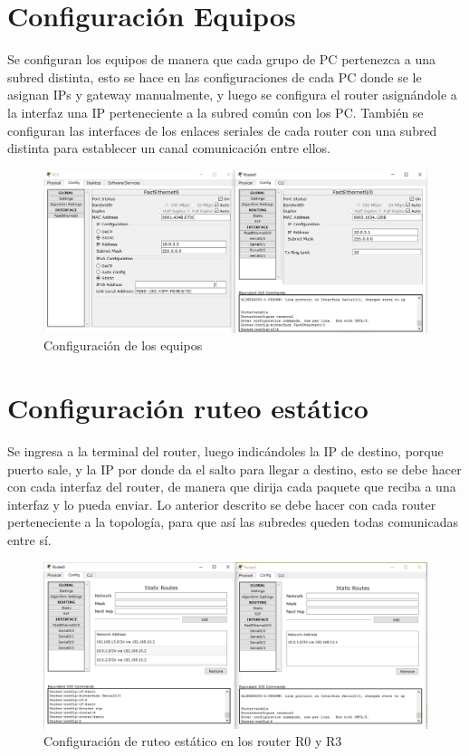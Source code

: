 \documentclass{udpreport}
\begin{document}
	\section{Configuración Equipos}
	Se configuran los equipos de manera que cada grupo de PC pertenezca a una subred distinta, esto se hace en las configuraciones de cada PC
	donde se le asignan IPs y gateway manualmente, y luego se configura el router asignándole a la interfaz una IP perteneciente a la subred común con los
	PC. También se configuran las interfaces de los enlaces seriales de cada router con una subred distinta para establecer un canal comunicación entre ellos.
	\begin{figure}[H]
	\centering
	\includegraphics[width=\textwidth]{Configuracion_equipos.PNG}
	\caption{Configuración de los equipos}
	\end{figure}
	\section{Configuración ruteo estático}
	Se ingresa a la terminal del router, luego indicándoles la IP de destino, porque puerto sale, y la IP por donde da el salto
	para llegar a destino, esto se debe hacer con cada interfaz del router, de manera que dirija cada paquete que reciba a una
	interfaz y lo pueda enviar. Lo anterior descrito se debe hacer con cada router perteneciente a la topología, para que así las
	subredes queden todas comunicadas entre sí.
	\begin{figure}[H]
	\centering
	\includegraphics[width=\textwidth]{Ruteo_estatico.PNG}
	\caption{Configuración de ruteo estático en los router R0 y R3}
	\end{figure}
\end{document}
